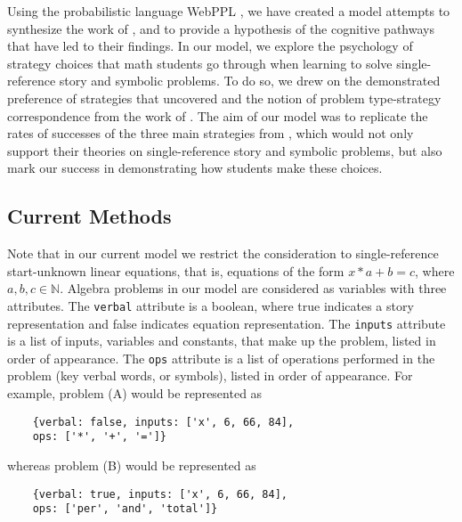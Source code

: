 \documentclass[10pt,letterpaper]{article}
\begin{document}
	Using the probabilistic language WebPPL \cite{dippl}, we have created a model attempts to synthesize the work of ,  and  to provide a hypothesis of the cognitive pathways that have led to their findings. In our model, we explore the psychology of strategy choices that math students go through when learning to solve single-reference story and symbolic problems. To do so, we drew on the demonstrated preference of strategies that  uncovered and the notion of problem type-strategy correspondence from the work of . The aim of our model was to replicate the rates of successes of the three main strategies from \cite{KoedNath2004}, which would not only support their theories on single-reference story and symbolic problems, but also mark our success in demonstrating how students make these choices. 
	
	\subsection{Current Methods}
	
	Note that in our current model we restrict the consideration to single-reference start-unknown linear equations, that is, equations of the form $x*a+b=c$, where $a,b,c\in\mathbb{N}$. Algebra problems in our model are considered as variables with three attributes. The \verb|verbal| attribute is a boolean, where true indicates a story representation and false indicates equation representation. The \verb|inputs| attribute is a list of inputs, variables and constants, that make up the problem, listed in order of appearance. The \verb|ops| attribute is a list of operations performed in the problem (key verbal words, or symbols), listed in order of appearance.
	For example, problem (A) would be represented as 
	\begin{verbatim}
	{verbal: false, inputs: ['x', 6, 66, 84], 
	ops: ['*', '+', '=']}
	\end{verbatim}
	whereas problem (B) would be represented as
	\begin{verbatim}
	{verbal: true, inputs: ['x', 6, 66, 84], 
	ops: ['per', 'and', 'total']}
	\end{verbatim}
	
\end{document}
